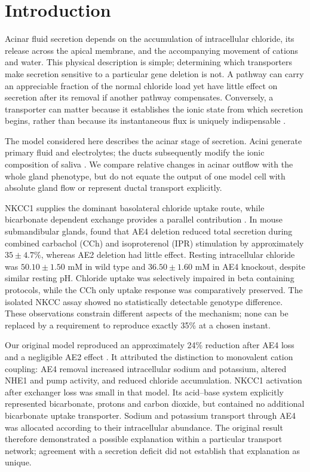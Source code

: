 \documentclass[11pt]{article}
\begin{document}
\section{Introduction}
\label{sec:introduction}

Acinar fluid secretion depends on the accumulation of intracellular chloride, its release across the apical membrane, and the accompanying movement of cations and water. This physical description is simple; determining which transporters make secretion sensitive to a particular gene deletion is not. A pathway can carry an appreciable fraction of the normal chloride load yet have little effect on secretion after its removal if another pathway compensates. Conversely, a transporter can matter because it establishes the ionic state from which secretion begins, rather than because its instantaneous flux is uniquely indispensable \citep{Melvin2005,Gin2007,Palk2010}.

The model considered here describes the acinar stage of secretion. Acini generate primary fluid and electrolytes; the ducts subsequently modify the ionic composition of saliva \citep{thaysen1954excretion,young1966micropuncture}. We compare relative changes in acinar outflow with the whole gland phenotype, but do not equate the output of one model cell with absolute gland flow or represent ductal transport explicitly.

NKCC1 supplies the dominant basolateral chloride uptake route, while bicarbonate dependent exchange provides a parallel contribution \citep{martinez1983effect,evans2000severe,nguyen2004cl}. In mouse submandibular glands, \citet{Pena2015} found that AE4 deletion reduced total secretion during combined carbachol (CCh) and isoproterenol (IPR) stimulation by approximately $35\pm4.7\%$, whereas AE2 deletion had little effect. Resting intracellular chloride was $50.10\pm1.50$ mM in wild type and $36.50\pm1.60$ mM in AE4 knockout, despite similar resting pH. Chloride uptake was selectively impaired in beta containing protocols, while the CCh only uptake response was comparatively preserved. The isolated NKCC assay showed no statistically detectable genotype difference. These observations constrain different aspects of the mechanism; none can be replaced by a requirement to reproduce exactly 35\% at a chosen instant.

Our original model reproduced an approximately 24\% reduction after AE4 loss and a negligible AE2 effect \citep{VeraSiguenza2018}. It attributed the distinction to monovalent cation coupling: AE4 removal increased intracellular sodium and potassium, altered NHE1 and pump activity, and reduced chloride accumulation. NKCC1 activation after exchanger loss was small in that model. Its acid--base system explicitly represented bicarbonate, protons and carbon dioxide, but contained no additional bicarbonate uptake transporter. Sodium and potassium transport through AE4 was allocated according to their intracellular abundance. The original result therefore demonstrated a possible explanation within a particular transport network; agreement with a secretion deficit did not establish that explanation as unique.
\end{document}
